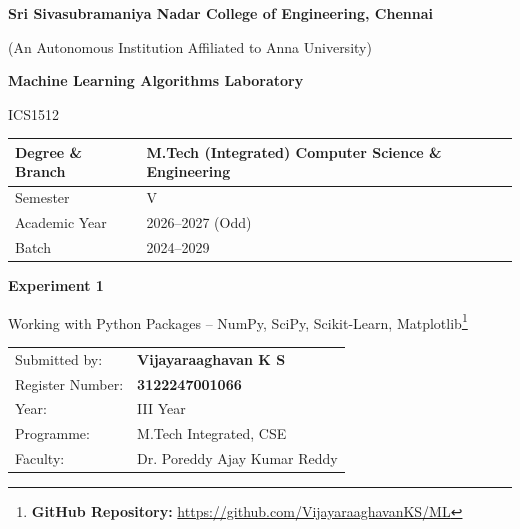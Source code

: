 \documentclass[11pt,a4paper]{article}
\title{}
\date{}
\begin{document}
\begin{titlepage}
\centering
\vspace*{1cm}
{\Large\bfseries Sri Sivasubramaniya Nadar College of Engineering, Chennai\par}
\vspace{0.2cm}
{\normalsize (An Autonomous Institution Affiliated to Anna University)\par}
\vspace{1.2cm}

{\Large\bfseries Machine Learning Algorithms Laboratory\par}
\vspace{0.3cm}
{\large ICS1512\par}
\vspace{1.5cm}

\begin{tabular}{|p{5.5cm}|p{7cm}|}
\hline
Degree \& Branch & M.Tech (Integrated) Computer Science \& Engineering \\
\hline
Semester & V \\
\hline
Academic Year & 2026--2027 (Odd) \\
\hline
Batch & 2024--2029 \\
\hline
\end{tabular}

\vspace{1.8cm}
{\Large\bfseries Experiment 1\par}
\vspace{0.3cm}
{\large Working with Python Packages -- NumPy, SciPy, Scikit-Learn, Matplotlib\footnote{\textbf{GitHub Repository: }\url{https://github.com/VijayaraaghavanKS/ML}}\par}
\vspace{2.5cm}

\begin{tabular}{ll}
Submitted by: & \textbf{Vijayaraaghavan K S} \\[4pt]
Register Number: & \textbf{3122247001066} \\[4pt]
Year: & III Year \\[4pt]
Programme: & M.Tech Integrated, CSE \\[4pt]
Faculty: & Dr. Poreddy Ajay Kumar Reddy \\[4pt]
\end{tabular}

\vfill
\end{titlepage}

\tableofcontents
\newpage
\end{document}
